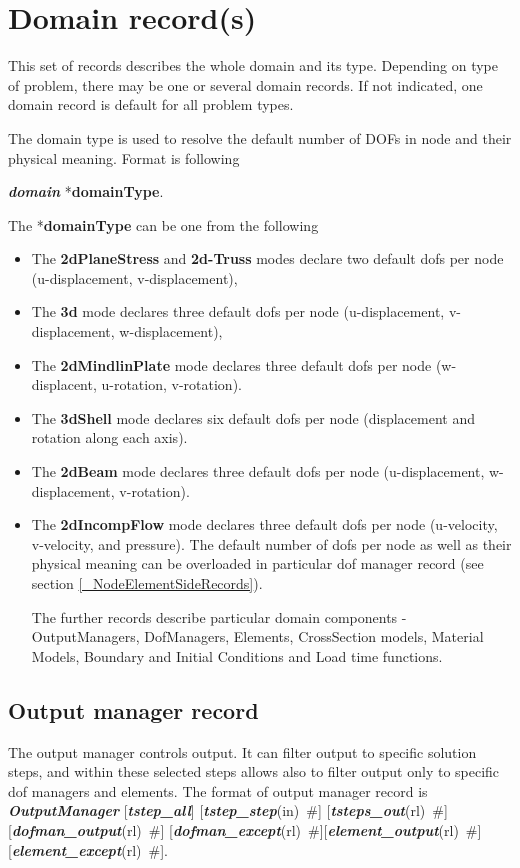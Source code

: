 \documentclass[draft]{article}
\newcommand{\keywordnotype}[1]{\mbox{{\it{\bf{#1}}}}}
\newcommand{\keyword}[2]{\mbox{{\keywordnotype{#1}\tiny (#2)}}}
\newcommand{\entKeyword}[1]{\mbox{{*{\bf{#1}}}}}
\newcommand{\entKeywordInst}[1]{\mbox{{\bf{{#1}}}}}
\newcommand{\field}[2]{\mbox{\keyword{#1}{#2}~\#}}
\newcommand{\optField}[2]{\mbox{[\field{#1}{#2}]}}
\begin{document}
\section{Domain record(s)}
\label{_DomainRecord}
This set of records describes the whole domain and its type. Depending
on type of problem, there may be one or several domain records. If not
indicated, one domain record is default for all problem types.

The domain type is used to resolve the
default number of DOFs in node and their physical meaning. Format is following

\keywordnotype{domain} \entKeyword{domainType}.

The \entKeyword{domainType} can be one from the following
\begin{itemize}
\item The \entKeywordInst{2dPlaneStress} and \entKeywordInst{2d-Truss}
modes declare two default dofs per node (u-displacement, v-displacement),
\item The \entKeywordInst{3d} mode declares three default dofs per
node (u-displacement, v-displacement, w-displacement),
\item The \entKeywordInst{2dMindlinPlate} mode declares three default
dofs per node (w-displacent, u-rotation, v-rotation).
\item The \entKeywordInst{3dShell} mode declares six default dofs
per node (displacement and rotation along each axis).
\item The \entKeywordInst{2dBeam} mode declares three default dofs per
node (u-displacement, w-displacement, v-rotation).
\item The \entKeywordInst{2dIncompFlow} mode declares three default
  dofs per node (u-velocity, v-velocity, and pressure).
The default number of dofs per node as well as their physical meaning
can be overloaded in particular dof manager record (see section
\ref{_NodeElementSideRecords}).

The further records describe particular domain components - 
OutputManagers, DofManagers, Elements, CrossSection models, Material
Models, Boundary and Initial Conditions and Load time functions.

\end{itemize}


\subsection{Output manager record}
\label{_OutputManagerRecord}
The output manager controls output. It can filter output to specific
solution steps, and within these selected steps allows also to filter
output only to specific dof managers and elements. The format of
output manager record is \\
\keywordnotype{OutputManager} [\keywordnotype{tstep\_all}]
\optField{tstep\_step}{in} \optField{tsteps\_out}{rl}\newline
[\keywordnotype{dofman\_all}] \optField{dofman\_output}{rl}
\optField{dofman\_except}{rl}\newline
[\keywordnotype{element\_all}] \optField{element\_output}{rl} \optField{element\_except}{rl}.\\
\end{document}
